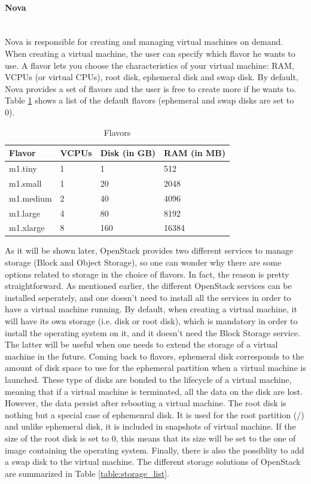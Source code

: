 \paragraph{Nova}\mbox{}\\
Nova is responsible for creating and managing virtual machines on demand. When creating a virtual machine, the user can specify which flavor he wants to use. A flavor lets you choose the characteristics of your virtual machine: RAM, VCPUs (or virtual CPUs), root disk, ephemeral disk and swap disk. By default, Nova provides a set of flavors and the user is free to create more if he wants to. Table \ref{table:flavors_list} shows a list of the default flavors (ephemeral and swap disks are set to 0).

\begin{table}[h]
	\centering
	\begin{tabular}{|l|l|l|l|}
		\hline
		\textbf{Flavor} & \textbf{VCPUs} & \textbf{Disk (in GB)} & \textbf{RAM (in MB)}\\
		\hline
		m1.tiny & 1 & 1 & 512 \\
		m1.small & 1 & 20 & 2048 \\
		m1.medium & 2 & 40 & 4096 \\
		m1.large & 4 & 80 & 8192 \\
		m1.xlarge & 8 & 160 & 16384 \\
		\hline
	\end{tabular}
	\caption{Flavors}
	\label{table:flavors_list}
\end{table}

As it will be shown later, OpenStack provides two different services to manage storage (Block and Object Storage), so one can wonder why there are some options related to storage in the choice of flavors. 
In fact, the reason is pretty straightforward.
As mentioned earlier, the different OpenStack services can be installed seperately, and one doesn't need to install all the services in order to have a virtual machine running.
By default, when creating a virtual machine, it will have its own storage (i.e. disk or root disk), which is mandatory in order to install the operating system on it, and it doesn't need the Block Storage service. 
The latter will be useful when one needs to extend the storage of a virtual machine in the future. 
Coming back to flavors, ephemeral disk corresponds to the amount of disk space to use for the ephemeral partition when a virtual machine is launched. 
These type of disks are bonded to the lifecycle of a virtual machine, meaning that if a virtual machine is terminated, all the data on the disk are lost. 
However, the data persist after rebooting a virtual machine. 
The root disk is nothing but a special case of ephemenral disk. 
It is used for the root partition (/) and unlike ephemeral disk, it is included in snapshots of virtual machine. 
If the size of the root disk is set to 0, this means that its size will be set to the one of image containing the operating system.
Finally, there is also the possiblity to add a swap disk to the virtual machine.
The different storage solutions of OpenStack are summarized in Table \ref{table:storage_list}.

